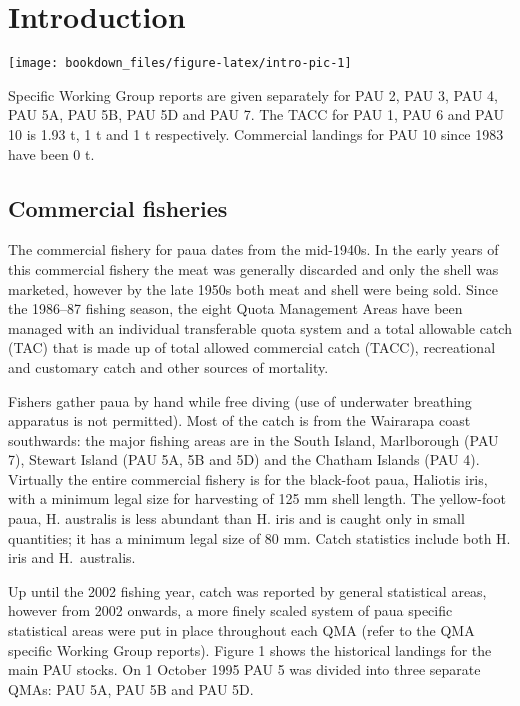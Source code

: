 \documentclass{mpi-plenary}
\theoremstyle{definition}
\theoremstyle{definition}
\theoremstyle{definition}
\theoremstyle{remark}
\begin{document}
\section{Introduction}\label{introduction-1}

\begin{center}\texttt{[image: bookdown\_files/figure-latex/intro-pic-1]} \end{center}

Specific Working Group reports are given separately for PAU 2, PAU 3,
PAU 4, PAU 5A, PAU 5B, PAU 5D and PAU 7. The TACC for PAU 1, PAU 6 and
PAU 10 is 1.93 t, 1 t and 1 t respectively. Commercial landings for PAU
10 since 1983 have been 0 t.

\subsection{Commercial fisheries}\label{commercial-fisheries}

The commercial fishery for paua dates from the mid-1940s. In the early
years of this commercial fishery the meat was generally discarded and
only the shell was marketed, however by the late 1950s both meat and
shell were being sold. Since the 1986--87 fishing season, the eight
Quota Management Areas have been managed with an individual transferable
quota system and a total allowable catch (TAC) that is made up of total
allowed commercial catch (TACC), recreational and customary catch and
other sources of mortality.

Fishers gather paua by hand while free diving (use of underwater
breathing apparatus is not permitted). Most of the catch is from the
Wairarapa coast southwards: the major fishing areas are in the South
Island, Marlborough (PAU 7), Stewart Island (PAU 5A, 5B and 5D) and the
Chatham Islands (PAU 4). Virtually the entire commercial fishery is for
the black-foot paua, Haliotis iris, with a minimum legal size for
harvesting of 125 mm shell length. The yellow-foot paua, H. australis is
less abundant than H. iris and is caught only in small quantities; it
has a minimum legal size of 80 mm. Catch statistics include both H. iris
and H.~australis.

Up until the 2002 fishing year, catch was reported by general
statistical areas, however from 2002 onwards, a more finely scaled
system of paua specific statistical areas were put in place throughout
each QMA (refer to the QMA specific Working Group reports). Figure 1
shows the historical landings for the main PAU stocks. On 1 October 1995
PAU 5 was divided into three separate QMAs: PAU 5A, PAU 5B and PAU 5D.
\end{document}
